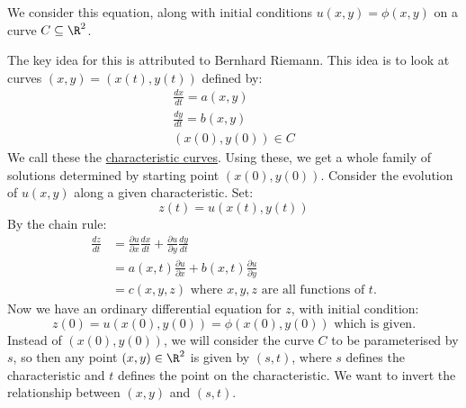 \documentclass[../Main.tex]{subfiles}
\begin{document}
We consider this equation, along with initial conditions $u(x, y) = \phi(x, y)$ on a curve $C \subseteq \R^2$.

The key idea for this is attributed to Bernhard Riemann. This idea is to look at curves $(x, y) = (x(t), y(t))$ defined by:
\begin{gather*}
    \frac{dx}{dt} = a(x, y) \\
    \frac{dy}{dt} = b(x, y) \\
    (x(0),y(0)) \in C
\end{gather*}
We call these the \underline{characteristic curves}. Using these, we get a whole family of solutions determined by starting point $(x(0), y(0))$. Consider the evolution of $u(x, y)$ along a given characteristic. Set:
\begin{equation*}
    z(t) = u(x(t), y(t))
\end{equation*}
By the chain rule:
\begin{align*}
    \frac{dz}{dt} &= \frac{\partial u}{\partial x} \frac{dx}{dt} + \frac{\partial u}{\partial y} \frac{dy}{dt} \\
    &= a(x, t) \frac{\partial u}{\partial x} + b(x, t) \frac{\partial u}{\partial y} \\
    &= c(x, y, z) \text{ where $x, y, z$ are all functions of $t$.}
\end{align*}
Now we have an ordinary differential equation for $z$, with initial condition:
\begin{equation*}
    z(0) = u(x(0), y(0)) = \phi(x(0), y(0)) \text{ which is given.}
\end{equation*}
Instead of $(x(0), y(0))$, we will consider the curve $C$ to be parameterised by $s$, so then any point $(x, y) \in \R^2$ is given by $(s, t)$, where $s$ defines the characteristic and $t$ defines the point on the characteristic. We want to invert the relationship between $(x, y)$ and $(s, t)$.
\end{document}
